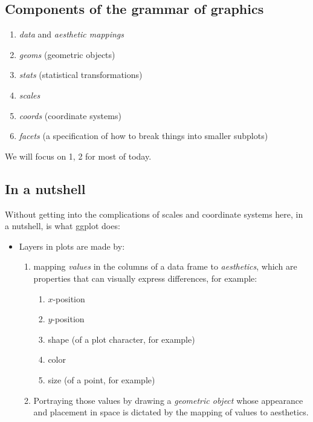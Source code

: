 \documentclass[]{book}
\providecommand{\tightlist}{%
  \setlength{\itemsep}{0pt}\setlength{\parskip}{0pt}}
\theoremstyle{definition}
\theoremstyle{definition}
\theoremstyle{remark}
\begin{document}
\subsection{Components of the grammar of
graphics}\label{components-of-the-grammar-of-graphics}

\begin{enumerate}
\def\labelenumi{\arabic{enumi}.}
\tightlist
\item
  \emph{data} and \emph{aesthetic mappings}
\item
  \emph{geoms} (geometric objects)
\item
  \emph{stats} (statistical transformations)
\item
  \emph{scales}
\item
  \emph{coords} (coordinate systems)
\item
  \emph{facets} (a specification of how to break things into smaller
  subplots)
\end{enumerate}

We will focus on 1, 2 for most of today.

\subsection{In a nutshell}\label{in-a-nutshell}

Without getting into the complications of scales and coordinate systems
here, in a nutshell, is what ggplot does:

\begin{itemize}
\tightlist
\item
  Layers in plots are made by:

  \begin{enumerate}
  \def\labelenumi{\arabic{enumi}.}
  \tightlist
  \item
    mapping \emph{values} in the columns of a data frame to
    \emph{aesthetics}, which are properties that can visually express
    differences, for example:

    \begin{enumerate}
    \def\labelenumii{\alph{enumii}.}
    \tightlist
    \item
      \(x\)-position
    \item
      \(y\)-position
    \item
      shape (of a plot character, for example)
    \item
      color
    \item
      size (of a point, for example)
    \end{enumerate}
  \item
    Portraying those values by drawing a \emph{geometric object} whose
    appearance and placement in space is dictated by the mapping of
    values to aesthetics.
  \end{enumerate}
\end{itemize}
\end{document}
